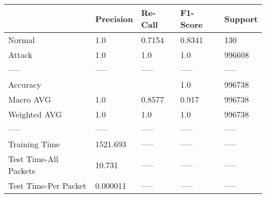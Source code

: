 \begin{tabular}{lllll}
\toprule
{} & Precision & Re-Call & F1-Score & Support \\
\midrule
Normal                &       1.0 &  0.7154 &   0.8341 &     130 \\
Attack                &       1.0 &     1.0 &      1.0 &  996608 \\
-----                 &     ----- &   ----- &    ----- &   ----- \\
Accuracy              &           &         &      1.0 &  996738 \\
Macro AVG             &       1.0 &  0.8577 &    0.917 &  996738 \\
Weighted AVG          &       1.0 &     1.0 &      1.0 &  996738 \\
-----                 &     ----- &   ----- &    ----- &   ----- \\
Training Time         &  1521.693 &   ----- &    ----- &   ----- \\
Test Time-All Packets &    10.731 &   ----- &    ----- &   ----- \\
Test Time-Per Packet  &  0.000011 &   ----- &    ----- &   ----- \\
\bottomrule
\end{tabular}
